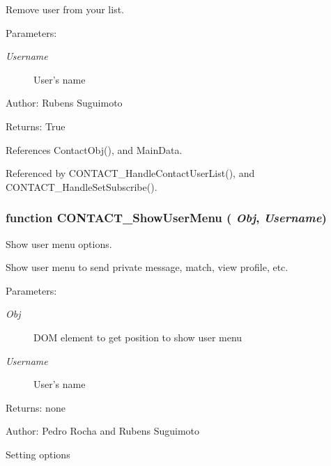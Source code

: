 Remove user from your list. 

\begin{Desc}
\item[Parameters:]
\begin{description}
\item[{\em Username}]User's name \end{description}
\end{Desc}
\begin{Desc}
\item[Author:]Rubens Suguimoto \end{Desc}
\begin{Desc}
\item[Returns:]True \end{Desc}


References ContactObj(), and MainData.

Referenced by CONTACT\_\-HandleContactUserList(), and CONTACT\_\-HandleSetSubscribe().
\subsubsection[CONTACT\_\-ShowUserMenu]{\setlength{\rightskip}{0pt plus 5cm}function CONTACT\_\-ShowUserMenu ( {\em Obj}, \/   {\em Username})}\label{contact_2contact_8js_8c339eb1f5ab5660dde74ee3c92061d3}


Show user menu options. 

Show user menu to send private message, match, view profile, etc.

\begin{Desc}
\item[Parameters:]
\begin{description}
\item[{\em Obj}]DOM element to get position to show user menu \item[{\em Username}]User's name \end{description}
\end{Desc}
\begin{Desc}
\item[Returns:]none\end{Desc}
\begin{Desc}
\item[Author:]Pedro Rocha and Rubens Suguimoto \end{Desc}


Setting options 

